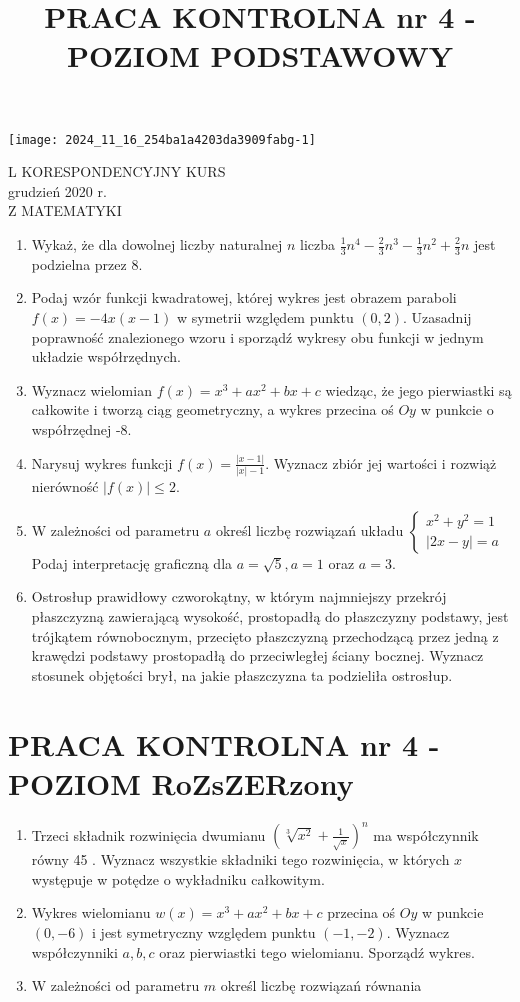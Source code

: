 \documentclass[10pt]{article}
\title{PRACA KONTROLNA nr 4 - POZIOM PODSTAWOWY }
\author{}
\date{}
\begin{document}
\maketitle
\begin{center}
\texttt{[image: 2024\_11\_16\_254ba1a4203da3909fabg-1]}
\end{center}

L KORESPONDENCYJNY KURS\\
grudzień 2020 r.\\
Z MATEMATYKI

\begin{enumerate}
  \item Wykaż, że dla dowolnej liczby naturalnej $n$ liczba $\frac{1}{3} n^{4}-\frac{2}{3} n^{3}-\frac{1}{3} n^{2}+\frac{2}{3} n$ jest podzielna przez 8.
  \item Podaj wzór funkcji kwadratowej, której wykres jest obrazem paraboli $f(x)=-4 x(x-1)$ w symetrii względem punktu $(0,2)$. Uzasadnij poprawność znalezionego wzoru i sporządź wykresy obu funkcji w jednym układzie współrzędnych.
  \item Wyznacz wielomian $f(x)=x^{3}+a x^{2}+b x+c$ wiedząc, że jego pierwiastki są całkowite i tworzą ciąg geometryczny, a wykres przecina oś $O y$ w punkcie o współrzędnej -8.
  \item Narysuj wykres funkcji $f(x)=\frac{|x-1|}{|x|-1}$. Wyznacz zbiór jej wartości i rozwiąż nierówność $|f(x)| \leqslant 2$.
  \item W zależności od parametru $a$ określ liczbę rozwiązań układu $\left\{\begin{array}{l}x^{2}+y^{2}=1 \\ |2 x-y|=a\end{array}\right.$ Podaj interpretację graficzną dla $a=\sqrt{5}, a=1$ oraz $a=3$.
  \item Ostrosłup prawidłowy czworokątny, w którym najmniejszy przekrój płaszczyzną zawierającą wysokość, prostopadłą do płaszczyzny podstawy, jest trójkątem równobocznym, przecięto płaszczyzną przechodzącą przez jedną z krawędzi podstawy prostopadłą do przeciwległej ściany bocznej. Wyznacz stosunek objętości brył, na jakie płaszczyzna ta podzieliła ostrosłup.
\end{enumerate}

\section*{PRACA KONTROLNA nr 4 - POZIOM RoZsZERzony}
\begin{enumerate}
  \item Trzeci składnik rozwinięcia dwumianu $\left(\sqrt[3]{x^{2}}+\frac{1}{\sqrt{x}}\right)^{n}$ ma współczynnik równy 45 . Wyznacz wszystkie składniki tego rozwinięcia, w których $x$ występuje w potędze o wykładniku całkowitym.
  \item Wykres wielomianu $w(x)=x^{3}+a x^{2}+b x+c$ przecina oś $O y$ w punkcie $(0,-6)$ i jest symetryczny względem punktu $(-1,-2)$. Wyznacz współczynniki $a, b, c$ oraz pierwiastki tego wielomianu. Sporządź wykres.
  \item W zależności od parametru $m$ określ liczbę rozwiązań równania
\end{enumerate}
\end{document}
